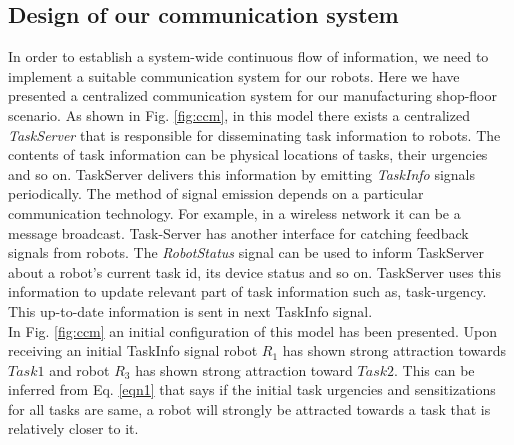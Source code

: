 \subsection{Design of our communication system}
In order to establish a system-wide continuous flow of information, we need to implement a suitable communication system for our robots. Here we have presented a centralized communication system for our manufacturing shop-floor scenario.
As shown in Fig. \ref{fig:ccm}, in this model there exists a centralized \textit{
TaskServer} that is responsible for disseminating task information to robots. The contents of task information can be physical locations of tasks, their urgencies and so on. TaskServer delivers this information by emitting \textit{TaskInfo} signals periodically. The method of signal emission depends on a particular communication technology. For example, in a wireless network it can be a message broadcast.
Task-Server has another interface for catching feedback signals from robots. The \textit{RobotStatus} signal can be used to inform TaskServer about a robot's current task id, its device status and so on. TaskServer uses this information to update relevant part of task information such as, task-urgency. This up-to-date information is sent in next TaskInfo signal.\\
In Fig. \ref{fig:ccm} an initial configuration of this model has been presented. Upon receiving an initial TaskInfo signal robot $R_1$ has shown strong attraction towards $Task1$ and robot $R_3$ has shown strong attraction toward $Task2$. This can be inferred from Eq. \ref{eqn1} that says if the initial task urgencies and sensitizations for all tasks are same, a robot will strongly be attracted towards a task that is relatively closer to it.
